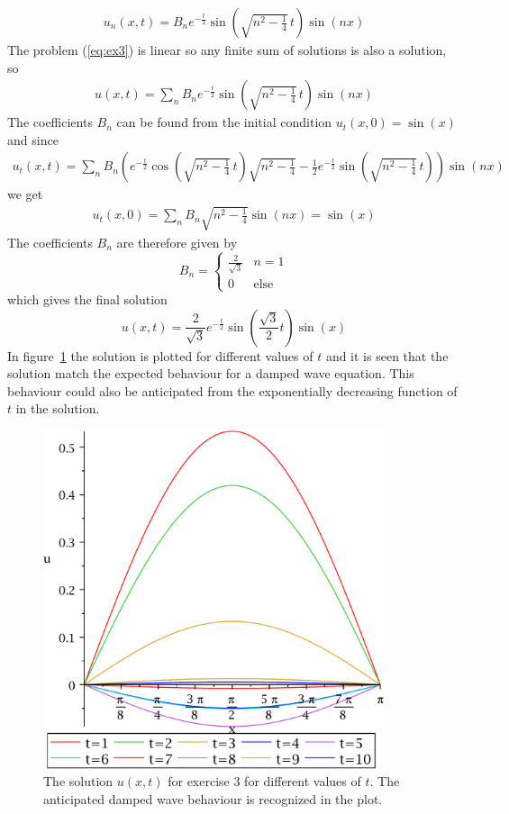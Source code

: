 \documentclass[11pt]{article}
\begin{document}
\begin{align*}
    u_n(x,t) = B_n e^{-\frac{t}{2}} \sin\left(\sqrt{n^2-\frac{1}{4}}\,t\right) \sin(nx)
\end{align*}
The problem (\ref{eq:ex3}) is linear so any finite sum of solutions is also a solution, so
\begin{align*}
    u(x,t) = \sum_n B_n e^{-\frac{t}{2}} \sin\left(\sqrt{n^2-\frac{1}{4}}\,t\right) \sin(nx)
\end{align*}
The coefficients $B_n$ can be found from the initial condition $u_t(x,0)=\sin(x)$ and since
\begin{align*}
    u_t(x,t) = \sum_n B_n \left(e^{-\frac{t}{2}} \cos\left(\sqrt{n^2-\frac{1}{4}}\,t\right) \sqrt{n^2-\frac{1}{4}} - \frac{1}{2}e^{-\frac{t}{2}} \sin\left(\sqrt{n^2-\frac{1}{4}}\,t\right)\right) \sin(nx)
\end{align*}
we get
\begin{align*}
    u_t(x,0) = \sum_n B_n \sqrt{n^2-\frac{1}{4}} \sin(nx) = \sin(x)
\end{align*}
The coefficients $B_n$ are therefore given by
\begin{equation*}
    B_n = \begin{cases}
        \frac{2}{\sqrt{3}} & n=1 \\
        0 & \text{else}
    \end{cases}
\end{equation*}
which gives the final solution
\begin{equation*}
    u(x, t) = \frac{2}{\sqrt{3}} e^{-\frac{t}{2}}\sin\left(\frac{\sqrt{3}}{2}t\right)\sin(x)
\end{equation*}
In figure~\ref{fig:ex3} the solution is plotted for different values of $t$ and it is seen that the solution match the expected behaviour for a damped wave equation. This behaviour could also be anticipated from the exponentially decreasing function of $t$ in the solution.

\begin{figure}
    \centering
    \includegraphics[width=100mm]{ex-3.pdf}
    \caption{The solution $u(x,t)$ for exercise 3 for different values of $t$. The anticipated damped wave behaviour is recognized in the plot.}
    \label{fig:ex3}
\end{figure}
\end{document}
